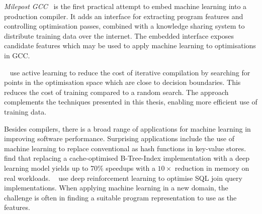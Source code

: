 


\emph{Milepost GCC}~\cite{Fursin2011} is the first practical attempt to embed machine learning into a production compiler. It adds an interface for extracting program features and controlling optimisation passes, combined with a knowledge sharing system to distribute training data over the internet. The embedded interface exposes candidate features which may be used to apply machine learning to optimisations in GCC.

\citeauthor{Ogilvie2017}~\cite{Ogilvie2017} use active learning to reduce the cost of iterative compilation by searching for points in the optimisation space which are close to decision boundaries. This reduces the cost of training compared to a random search. The approach complements the techniques presented in this thesis, enabling more efficient use of training data.

Besides compilers, there is a broad range of applications for machine learning in improving software performance.
Surprising applications include the use of machine learning to replace conventional as hash functions in key-value stores. \citeauthor{Kraska2017}~\cite{Kraska2017} find that replacing a cache-optimised B-Tree-Index implementation with a deep learning model yields up to 70\% speedups with a $10\times$ reduction in memory on real workloads.
\citeauthor{Krishnan2018}~\cite{Krishnan2018} use deep reinforcement learning to optimise SQL join query implementations. %
When applying machine learning in a new domain, the challenge is often in finding a suitable program representation to use as the features.


